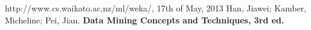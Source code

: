\begin{thebibliography}{9}
\label{Biblio}
 http://www.cs.waikato.ac.nz/ml/weka/, 17th of May, 2013
 Han, Jiawei; Kamber, Micheline; Pei, Jian. \textbf{Data Mining Concepts and Techniques, 3rd ed.}
\end{thebibliography}